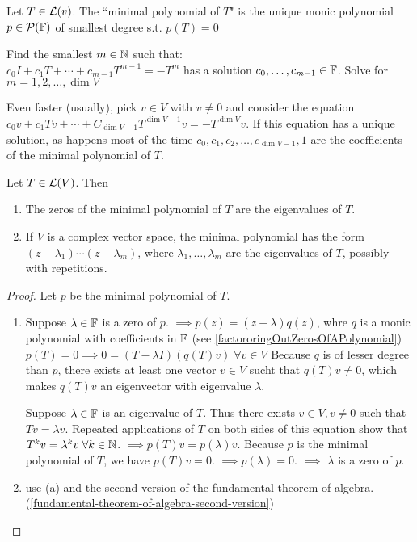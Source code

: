 \setcounter{thm}{23}

\begin{mydef}
    Let $T\in \mathcal{L} (v)$. The ``minimal polynomial of $T$" is the unique monic polynomial $p\in \mathcal{P}({\mathbb{F}})$ of smallest degree s.t. $p(T)=0$
\end{mydef}
 Find the smallest $m \in \mathbb{N}$ such that: \\
$c_0I + c_1 T + \cdots + c_{m-1} T^{m-1} = -T^{m}$ has a solution $c_0, \dots, c_{m-1} \in {\mathbb{F}}$. Solve for $m=1,2,\dots,\dim V$

Even faster (usually), pick $v \in V$ with $v \neq 0$ and consider the equation $c_0v + c_1Tv + \cdots + C_{\dim V-1}T^{\dim V-1}v=-T^{\dim V}v$. 
If this equation has a unique solution, as happens most of the time $c_0, c_1, c_2, \dots, c_{\dim V-1}, 1$ are the coefficients of the minimal polynomial of $T$.

\setcounter{thm}{26}
\begin{thm}
    Let $T \in \mathcal{L}(V)$. Then 
    \begin{enumerate}[label=(\alph*)]
        \item The zeros of the minimal polynomial of $T$ are the eigenvalues of $T$.
        \item If $V$ is a complex vector space, the minimal polynomial has the form $(z-\lambda_1)\cdots(z-\lambda_m)$, where $\lambda_1, \dots, \lambda_m$ are the eigenvalues of $T$, possibly with repetitions. 
    \end{enumerate}
\end{thm}
\begin{proof} Let $p$ be the minimal polynomial of $T$.
    \begin{enumerate}[label=(\alph*)]
        \item Suppose $\lambda \in {\mathbb{F}}$ is a zero of $p$. $\implies p(z)=(z-\lambda)q(z)$, whre $q$ is a monic polynomial with coefficients in ${\mathbb{F}}$ (see \ref{factororingOutZerosOfAPolynomial}) \\
        $p(T)=0\implies 0=(T-\lambda I)(q(T)v) \; \forall v\in V$
        Because $q$ is of lesser degree than $p$, there exists at least one vector $v\in V$ sucht that $q(T)v \neq 0$, which makes $q(T)v$ an eigenvector with eigenvalue $\lambda$.
        
        Suppose $\lambda \in {\mathbb{F}}$ is an eigenvalue of $T$. Thus there exists $v\in V, v \neq 0$ such that $Tv=\lambda v$. Repeated applications of $T$ on both sides of this equation show that $T^kv =\lambda^k v \; \forall k\in \mathbb{N}$. 
        $\implies p(T)v=p(\lambda)v$. Because $p$ is the minimal polynomial of $T$, we have $p(T)v=0$. $\implies p(\lambda) = 0$. $\implies$ $\lambda$ is a zero of $p$.
        
        \item use (a) and the second version of the fundamental theorem of algebra. (\ref{fundamental-theorem-of-algebra-second-version})
     \end{enumerate}
\end{proof}